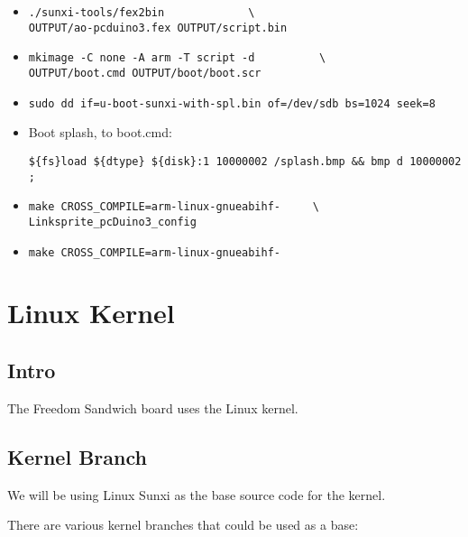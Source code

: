 \begin{itemize}
  \item{
  \begin{verbatim}
./sunxi-tools/fex2bin             \
OUTPUT/ao-pcduino3.fex OUTPUT/script.bin
  \end{verbatim}
  }

  \item{\begin{verbatim}
mkimage -C none -A arm -T script -d          \
OUTPUT/boot.cmd OUTPUT/boot/boot.scr
  \end{verbatim}
  }

  \item{
  \begin{verbatim}
sudo dd if=u-boot-sunxi-with-spl.bin of=/dev/sdb bs=1024 seek=8
  \end{verbatim}
  }

  \item{Boot splash, to boot.cmd:
  
  \verb|${fs}load ${dtype} ${disk}:1 10000002 /splash.bmp && bmp d 10000002 ;|
  }

  \item{
  \begin{verbatim}
make CROSS_COMPILE=arm-linux-gnueabihf-     \
Linksprite_pcDuino3_config
  \end{verbatim}
  }

  \item{
  \verb|make CROSS_COMPILE=arm-linux-gnueabihf-|
  }

\end{itemize}


\section{Linux Kernel}

\subsection{Intro}

The Freedom Sandwich board uses the Linux kernel.


\subsection{Kernel Branch}

We will be using Linux Sunxi as the base source code for the kernel.


There are various kernel branches that could be used as a base:

